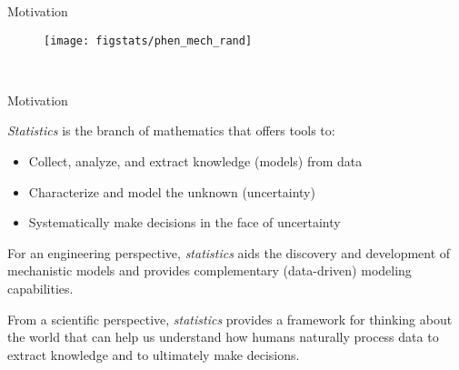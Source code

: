 \documentclass[handout,9pt]{beamer}
\begin{document}
\begin{frame}{Motivation}



\begin{figure}[!htb]
    \centering
	\texttt{[image: figstats/phen\_mech\_rand]}
\end{figure}
\
\end{frame}


%
\begin{frame}{Motivation}

{\em Statistics} is the branch of mathematics that offers tools to: 
\begin{itemize}
 \setlength{\itemsep}{5pt}
\item Collect, analyze, and extract knowledge (models) from data 
\item Characterize and model the unknown (uncertainty) 
\item Systematically make decisions in the face of uncertainty
\end{itemize}

\begin{block}{}
For an engineering perspective, {\em statistics} aids the discovery and development of mechanistic models and provides complementary (data-driven) modeling capabilities.  
\end{block}

\begin{block}{}
From a scientific perspective, {\em statistics} provides a framework for thinking about the world that can help us understand how humans naturally process data to extract knowledge and to ultimately make decisions. 
\end{block}
\end{frame}
\end{document}
